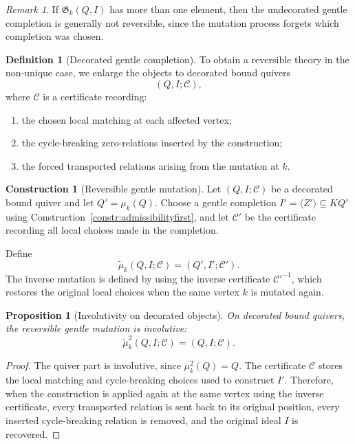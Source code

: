 \documentclass[11pt]{article}
\theoremstyle{plain}
\newtheorem{proposition}[theorem]{Proposition}
\theoremstyle{definition}
\newtheorem{definition}[theorem]{Definition}
\newtheorem{construction}[theorem]{Construction}
\theoremstyle{remark}
\newtheorem{remark}[theorem]{Remark}
\begin{document}
\begin{remark}
If \(\mathfrak G_k(Q,I)\) has more than one element, then the undecorated
gentle completion is generally not reversible, since the mutation process
forgets which completion was chosen.
\end{remark}

\begin{definition}[Decorated gentle completion]
To obtain a reversible theory in the non-unique case, we enlarge the objects to
decorated bound quivers
\[
(Q,I;\mathcal C),
\]
where \(\mathcal C\) is a certificate recording:
\begin{enumerate}[label=\textup{(\arabic*)},leftmargin=2.5em]
  \item the chosen local matching at each affected vertex;
  \item the cycle-breaking zero-relations inserted by the construction;
  \item the forced transported relations arising from the mutation at \(k\).
\end{enumerate}
\end{definition}

\begin{construction}[Reversible gentle mutation]\label{constr:reversible-gentle-mutation}
Let \((Q,I;\mathcal C)\) be a decorated bound quiver and let \(Q'=\mu_k(Q)\).
Choose a gentle completion \(I'=\langle Z'\rangle\subseteq KQ'\) using
Construction~\ref{constr:admissibilityfirst}, and let \(\mathcal C'\) be the
certificate recording all local choices made in the completion.

Define
\[
\widetilde{\mu}_k(Q,I;\mathcal C)=(Q',I';\mathcal C').
\]
The inverse mutation is defined by using the inverse certificate
\(\mathcal C'^{-1}\), which restores the original local choices when the same
vertex \(k\) is mutated again.
\end{construction}

\begin{proposition}[Involutivity on decorated objects]\label{prop:decorated-gentle-involutive}
On decorated bound quivers, the reversible gentle mutation is involutive:
\[
\widetilde{\mu}_k^2(Q,I;\mathcal C)=(Q,I;\mathcal C).
\]
\end{proposition}

\begin{proof}
The quiver part is involutive, since \(\mu_k^2(Q)=Q\).  The certificate
\(\mathcal C\) stores the local matching and cycle-breaking choices used to
construct \(I'\).  Therefore, when the construction is applied again at the
same vertex using the inverse certificate, every transported relation is sent
back to its original position, every inserted cycle-breaking relation is
removed, and the original ideal \(I\) is recovered.
\end{proof}
\end{document}

